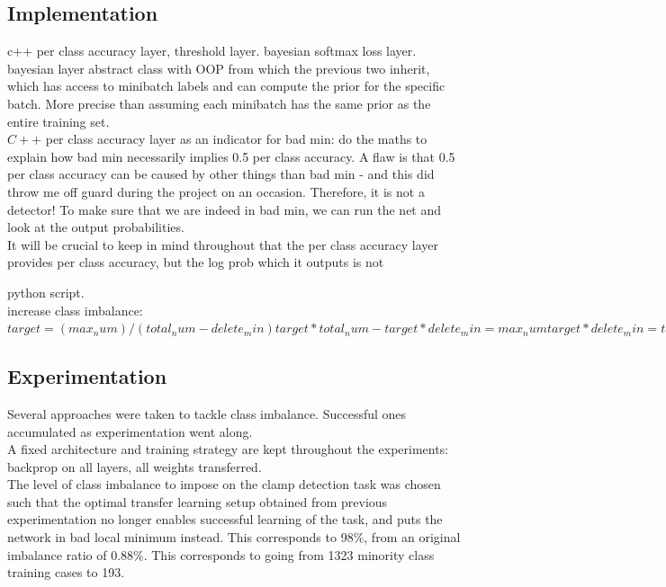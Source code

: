 \documentclass[a4paper,11pt]{article}
\begin{document}
\subsection{Implementation}

c++ per class accuracy layer, threshold layer. bayesian softmax loss layer. bayesian layer abstract class with OOP from which the previous two inherit, which has access to minibatch labels and can compute the prior for the specific batch. More precise than assuming each minibatch has the same prior as the entire training set. \\

$C++$ per class accuracy layer as an indicator for bad min: do the maths to explain how bad min necessarily implies 0.5 per class accuracy. A flaw is that 0.5 per class accuracy can be caused by other things than bad min - and this did throw me off guard during the project on an occasion. Therefore, it is not a detector! To make sure that we are indeed in bad min, we can run the net and look at the output probabilities. \\

It will be crucial to keep in mind throughout that the per class accuracy layer provides per class accuracy, but the log prob which it outputs is not 

python script. \\

increase class imbalance:
$target = (max_num) / (total_num - delete_min)
target*total_num - target*delete_min = max_num
target*delete_min = target*total_num - max_num
delete_min = total_num - (max_num/target)$


\subsection{Experimentation}

Several approaches were taken to tackle class imbalance. Successful ones accumulated as experimentation went along. \\

A fixed architecture and training strategy are kept throughout the experiments: backprop on all layers, all weights transferred. \\

The level of class imbalance to impose on the clamp detection task was chosen such that the optimal transfer learning setup obtained from previous experimentation no longer enables successful learning of the task, and puts the network in bad local minimum instead. This corresponds to 98\%, from an original imbalance ratio of 0.88\%. This corresponds to going from 1323 minority class training cases to 193. \\
\end{document}
